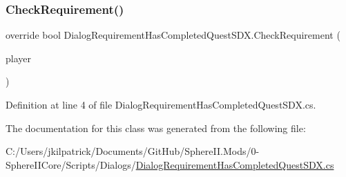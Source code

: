 \subsubsection{\texorpdfstring{CheckRequirement()}{CheckRequirement()}}
{\footnotesize\ttfamily override bool Dialog\+Requirement\+Has\+Completed\+Quest\+S\+D\+X.\+Check\+Requirement (\begin{DoxyParamCaption}\item[{Entity\+Player}]{player }\end{DoxyParamCaption})}



Definition at line 4 of file Dialog\+Requirement\+Has\+Completed\+Quest\+S\+D\+X.\+cs.



The documentation for this class was generated from the following file\+:\begin{DoxyCompactItemize}
\item 
C\+:/\+Users/jkilpatrick/\+Documents/\+Git\+Hub/\+Sphere\+I\+I.\+Mods/0-\/\+Sphere\+I\+I\+Core/\+Scripts/\+Dialogs/\mbox{\hyperlink{_dialog_requirement_has_completed_quest_s_d_x_8cs}{Dialog\+Requirement\+Has\+Completed\+Quest\+S\+D\+X.\+cs}}\end{DoxyCompactItemize}
